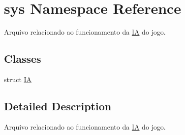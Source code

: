 \hypertarget{namespacesys}{}\section{sys Namespace Reference}
\label{namespacesys}


Arquivo relacionado ao funcionamento da \hyperlink{structsys_1_1IA}{IA} do jogo.  


\subsection*{Classes}
\begin{DoxyCompactItemize}
\item 
struct \hyperlink{structsys_1_1IA}{IA}
\end{DoxyCompactItemize}


\subsection{Detailed Description}
Arquivo relacionado ao funcionamento da \hyperlink{structsys_1_1IA}{IA} do jogo. 